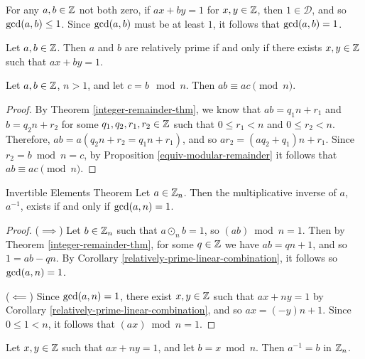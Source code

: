 \begin{rmk}
    For any $a, b \in \mathbb{Z}$ not both zero, if $ax + by = 1$ for $x, y \in \mathbb{Z}$, then $1 \in \mathcal{D}$, and so $\operatorname{gcd}(a, b) \leq 1$. Since $\operatorname{gcd}(a, b)$ must be at least $1$, it follows that $\operatorname{gcd}(a, b) = 1$.
\end{rmk}

\begin{cor}\label{relatively-prime-linear-combination}
    Let $a, b \in \mathbb{Z}$. Then $a$ and $b$ are relatively prime if and only if there exists $x, y \in \mathbb{Z}$ such that $ax + by = 1$.
\end{cor}

\begin{lemma}\label{modular-product-identification}
    Let $a, b \in \mathbb{Z}$, $n > 1$, and let $c = b \mod n$. Then $ab \equiv ac \pmod n$.
\end{lemma}

\begin{proof}
    By Theorem \ref{integer-remainder-thm}, we know that $ab = q_1n + r_1$ and $b = q_2n + r_2$ for some $q_1, q_2, r_1, r_2 \in \mathbb{Z}$ such that $0 \leq r_1 < n$ and $0 \leq r_2 < n$. Therefore, $ab = a(q_2n + r_2 = q_1n + r_1)$, and so $ar_2 = (aq_2 + q_1)n + r_1$. Since $r_2 = b \bmod n = c$, by Proposition \ref{equiv-modular-remainder} it follows that $ab \equiv ac \pmod n$.
\end{proof}

\begin{thm}{Invertible Elements Theorem}\label{invertible-elements}\proofbreak
    Let $a \in \mathbb{Z}_n$. Then the multiplicative inverse of $a$, $a^{-1}$, exists if and only if $\operatorname{gcd}(a, n) = 1$.
\end{thm}

\begin{proof}\proofbreak
    ($\implies$) Let $b \in \mathbb{Z}_n$ such that $a \odot_n b = 1$, so $(ab) \bmod n = 1$. Then by Theorem \ref{integer-remainder-thm}, for some $q \in \mathbb{Z}$ we have $ab = qn + 1$, and so $1 = ab - qn$. By Corollary \ref{relatively-prime-linear-combination}, it follows so $\operatorname{gcd}(a, n) = 1$.

    ($\impliedby$) Since $\operatorname{gcd}(a, n) = 1$, there exist $x, y \in \mathbb{Z}$ such that $ax + ny = 1$ by Corollary \ref{relatively-prime-linear-combination}, and so $ax = (-y)n + 1$. Since $0 \leq 1 < n$, it follows that $(ax) \bmod n = 1$.
\end{proof}

\begin{cor}
    Let $x, y \in \mathbb{Z}$ such that $ax + ny = 1$, and let $b = x \bmod n$. Then $a^{-1} = b$ in $\mathbb{Z}_n$.
\end{cor}

